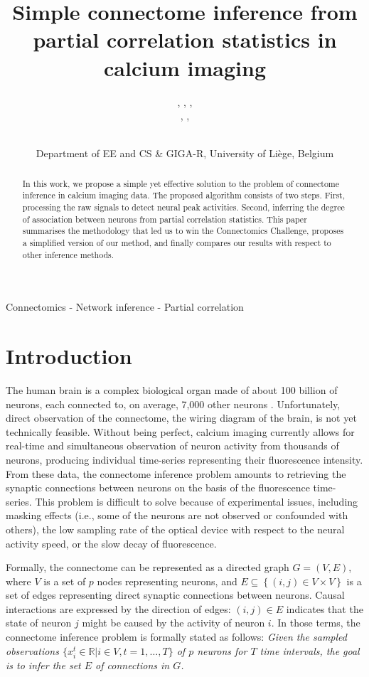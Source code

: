 \documentclass[wcp]{jmlr}
\title{Simple connectome inference from partial correlation statistics in calcium imaging}
\author{\Name{Antonio Sutera},
   \Name{Arnaud Joly},
   \Name{Vincent François-Lavet}, \Email{a.sutera@ulg.ac.be}\\
   \Name{Zixiao Aaron Qiu},
   \Name{Gilles Louppe},
   \Name{Damien Ernst}\and\Name{Pierre Geurts}
    \\
   \addr Department of EE and CS \& GIGA-R, University of Li\`ege, Belgium}
\begin{document}
\maketitle

\vspace{-0.8cm}
\begin{abstract}
In this work, we propose a simple yet effective solution to the problem of
connectome inference in calcium imaging data. The proposed algorithm consists of
two steps. First, processing the raw signals to detect neural peak activities.
Second, inferring the degree of association between neurons from partial
correlation statistics. This paper summarises the methodology that led us to
win the Connectomics Challenge, proposes a simplified version of our method, and
finally compares our results with respect to other inference methods.
\end{abstract}


\begin{keywords}
Connectomics - Network inference - Partial correlation
\end{keywords}


\section{Introduction}\label{sec:intro}

The human brain is a complex biological organ made of about 100 billion of
neurons, each connected to, on average, 7,000 other neurons
\citep{pakkenberg2003aging}. Unfortunately, direct observation of the
connectome, the wiring diagram of the brain, is not yet technically feasible.
Without being perfect, calcium imaging currently allows for real-time and
simultaneous observation of neuron activity from thousands of neurons,
producing individual time-series representing their fluorescence intensity.
From these data, the connectome inference problem amounts to retrieving the
synaptic connections between neurons on the basis of the fluorescence time-
series. This problem is difficult to solve because of experimental issues,
including masking effects (i.e., some of the neurons are not observed or
confounded with others), the low sampling rate of the optical device with
respect to the neural activity speed, or the slow decay of fluorescence.

Formally, the connectome can be represented as a directed graph $G=(V,E)$,
where $V$ is a set of $p$ nodes representing neurons, and $E \subseteq
\left\{(i, j) \in V \times V\right\}$ is a set of edges representing direct
synaptic connections between neurons. Causal interactions are expressed by the
direction of edges: $(i, j) \in E$ indicates that the state of neuron $j$ might
be caused by the activity of neuron $i$. In those terms,  the connectome
inference problem is formally stated as follows:  \textit{Given the sampled
observations $\{ x^t_i \in \mathbb{R} | i \in V, t = 1, \dots, T \}$ of $p$
neurons for $T$ time intervals, the goal is to infer the set $E$ of connections
in $G$.}
\end{document}
